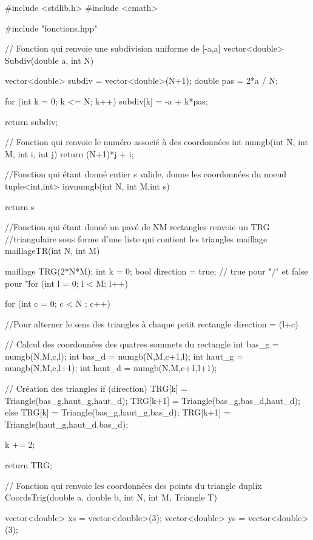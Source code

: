 \begin{codeblock}
#include <stdlib.h>
#include <cmath>

#include "fonctions.hpp"



// Fonction qui renvoie une subdivision uniforme de [-a,a]
vector<double> Subdiv(double a, int N){
    vector<double> subdiv = vector<double>(N+1);
    double pas = 2*a / N;

    for (int k = 0; k <= N; k++) subdiv[k] = -a + k*pas;

    return subdiv;
}

// Fonction qui renvoie le numéro associé à des coordonnées
int numgb(int N, int M, int i, int j){ return (N+1)*j + i; }

//Fonction qui étant donné entier s valide, donne les coordonnées du noeud
tuple<int,int> invnumgb(int N, int M,int s){
    return {s %
}

//Fonction qui étant donné un pavé de NM rectangles renvoie un TRG
//triangulaire sous forme d'une liste qui contient les triangles
maillage maillageTR(int N, int M){
    maillage TRG(2*N*M);
    int k = 0;
    bool direction = true; // true pour "/" et false pour "\"

    for (int l = 0; l < M; l++){
        for (int c = 0; c < N ; c++){

            //Pour alterner le sens des triangles à chaque petit rectangle
            direction = (l+c)%

            // Calcul des coordonnées des quatres sommets du rectangle
            int bas_g = numgb(N,M,c,l);
            int bas_d = numgb(N,M,c+1,l);
            int haut_g = numgb(N,M,c,l+1);
            int haut_d = numgb(N,M,c+1,l+1);

            // Création des triangles
            if (direction){
                TRG[k] = Triangle(bas_g,haut_g,haut_d);
                TRG[k+1] = Triangle(bas_g,bas_d,haut_d);
            } else {
                TRG[k] = Triangle(bas_g,haut_g,bas_d);
                TRG[k+1] = Triangle(haut_g,haut_d,bas_d);
            }

            k += 2;
        }
    }

    return TRG;
}


// Fonction qui renvoie les coordonnées des points du triangle
duplix CoordsTrig(double a, double b, int N,
    int M, Triangle T){
    vector<double> xs = vector<double>(3);
    vector<double> ys = vector<double>(3);

}}
\end{codeblock}
